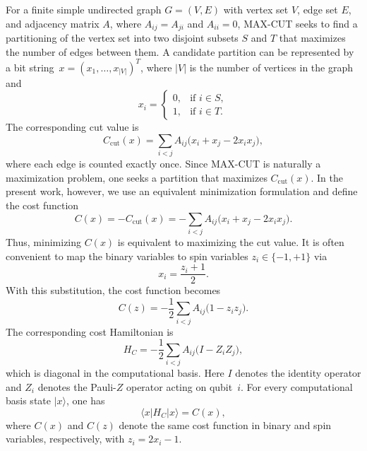 \documentclass[conference]{IEEEtran}
\begin{document}
For a finite simple undirected graph \(G=(V,E)\) with vertex set \(V\), edge set
\(E\), and adjacency matrix \(A\), where \(A_{ij}=A_{ji}\) and \(A_{ii}=0\),
MAX-CUT seeks to find a partitioning of the vertex set into two disjoint subsets
\(S\) and \(T\) that maximizes the number of edges between them. A candidate
partition can be represented by a bit string~\(x=(x_1,\dots,x_{|V|})^T\), where
\(|V|\) is the number of vertices in the graph and
\begin{equation}
x_i=
\begin{cases}
0,& \text{if } i\in S,\\
1,& \text{if } i\in T.
\end{cases}
\label{eq:partition}
\end{equation}
The corresponding cut value is
\begin{equation}
    C_{\mathrm{cut}}(x)=\sum_{i<j}A_{ij}\bigl(x_i+x_j-2x_ix_j\bigr),
    \label{eq:cut_value}
\end{equation}
where each edge is counted exactly once. Since MAX-CUT is naturally a
maximization problem, one seeks a partition that maximizes
\(C_{\mathrm{cut}}(x)\). In the present work, however, we use an equivalent
minimization formulation and define the cost function
\begin{equation}
C(x)=-C_{\mathrm{cut}}(x)
=-\sum_{i<j}A_{ij}\bigl(x_i+x_j-2x_ix_j\bigr).
\label{eq:cost_function}
\end{equation}
Thus, minimizing \(C(x)\) is equivalent to maximizing the cut value. It is often
convenient to map the binary variables to spin variables \(z_i\in\{-1,+1\}\) via
\begin{equation}
    x_i=\frac{z_i+1}{2}.
    \label{eq:map_bit_spin}
\end{equation} 
With this substitution, the cost function becomes
\begin{equation}
   C(z)=-\frac{1}{2}\sum_{i<j} A_{ij}\bigl(1-z_i z_j\bigr). 
   \label{eq:cost_function_spin}
\end{equation}
The corresponding cost Hamiltonian is
\begin{equation}
    H_C=-\frac{1}{2}\sum_{i<j} A_{ij}\bigl(I-Z_iZ_j\bigr),
    \label{eq:cost_Hamiltonian}
\end{equation}
which is diagonal in the computational basis. Here \(I\) denotes the identity
operator and \(Z_i\) denotes the Pauli-\(Z\) operator acting on qubit~\(i\). For
every computational basis state \(|x\rangle\), one has
\begin{equation}
    \langle x|H_C|x\rangle = C(x),
    \label{eq:hc_expectation_cost}
\end{equation}
where \(C(x)\) and \(C(z)\) denote the same cost function in binary and spin
variables, respectively, with \(z_i=2x_i-1\).
\end{document}
